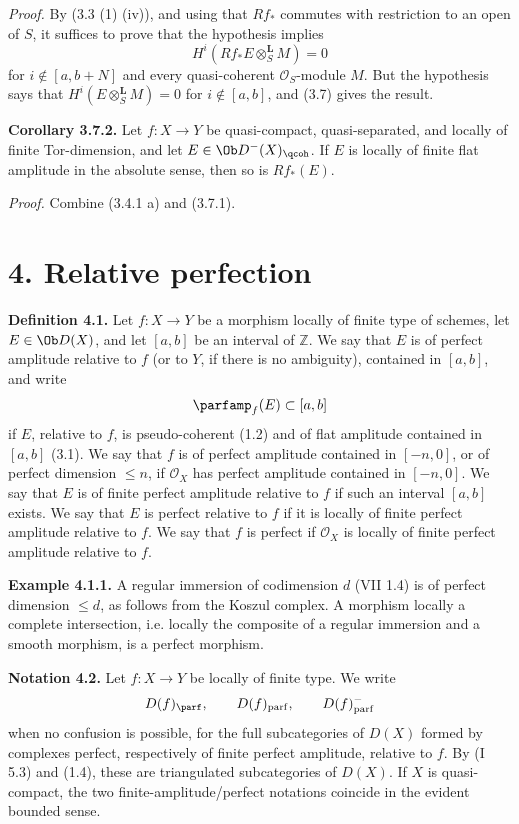 \documentclass[11pt]{article}
\begin{document}
\emph{Proof.} By (3.3 (1) (iv)), and using that \(Rf_*\) commutes with restriction to an open of \(S\), it suffices to prove that the hypothesis implies
\[
 H^i(Rf_*E\otimes_S^{\mathbf L}M)=0
\]
for \(i\notin[a,b+N]\) and every quasi-coherent \(\mathcal O_S\)-module \(M\). But the hypothesis says that \(H^i(E\otimes_S^{\mathbf L}M)=0\) for \(i\notin[a,b]\), and (3.7) gives the result.

\textbf{Corollary 3.7.2.} Let \(f:X\to Y\) be quasi-compact, quasi-separated, and locally of finite Tor-dimension, and let \(E\in\Ob D^{-}(X)_{\qcoh}\). If \(E\) is locally of finite flat amplitude in the absolute sense, then so is \(Rf_*(E)\).

\emph{Proof.} Combine (3.4.1 a) and (3.7.1).

\section*{4. Relative perfection}

\textbf{Definition 4.1.} Let \(f:X\to Y\) be a morphism locally of finite type of schemes, let \(E\in\Ob D(X)\), and let \([a,b]\) be an interval of \(\mathbb Z\). We say that \(E\) is of perfect amplitude relative to \(f\) (or to \(Y\), if there is no ambiguity), contained in \([a,b]\), and write
\[
 \parfamp_f(E)\subset[a,b]
\]
if \(E\), relative to \(f\), is pseudo-coherent (1.2) and of flat amplitude contained in \([a,b]\) (3.1). We say that \(f\) is of perfect amplitude contained in \([-n,0]\), or of perfect dimension \(\leq n\), if \(\mathcal O_X\) has perfect amplitude contained in \([-n,0]\). We say that \(E\) is of finite perfect amplitude relative to \(f\) if such an interval \([a,b]\) exists. We say that \(E\) is perfect relative to \(f\) if it is locally of finite perfect amplitude relative to \(f\). We say that \(f\) is perfect if \(\mathcal O_X\) is locally of finite perfect amplitude relative to \(f\).

\textbf{Example 4.1.1.} A regular immersion of codimension \(d\) (VII 1.4) is of perfect dimension \(\leq d\), as follows from the Koszul complex. A morphism locally a complete intersection, i.e. locally the composite of a regular immersion and a smooth morphism, is a perfect morphism.

\textbf{Notation 4.2.} Let \(f:X\to Y\) be locally of finite type. We write
\[
 D(f)_{\parf},\qquad D(f)_{\mathrm{parf}},\qquad D(f)_{\mathrm{parf}}^{-}
\]
when no confusion is possible, for the full subcategories of \(D(X)\) formed by complexes perfect, respectively of finite perfect amplitude, relative to \(f\). By (I 5.3) and (1.4), these are triangulated subcategories of \(D(X)\). If \(X\) is quasi-compact, the two finite-amplitude/perfect notations coincide in the evident bounded sense.
\end{document}

